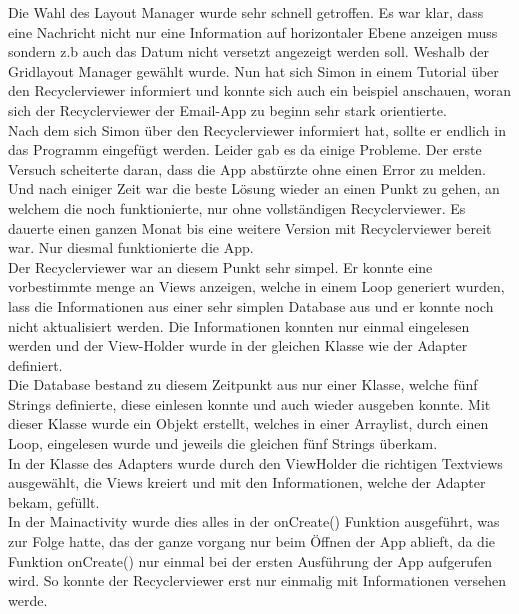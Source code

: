 \documentclass[a4paper,11pt]{article}
\begin{document}
Die Wahl des Layout Manager wurde sehr schnell getroffen. Es war klar, dass eine Nachricht nicht nur eine Information auf horizontaler Ebene anzeigen muss sondern
z.b auch das Datum nicht versetzt angezeigt werden soll. Weshalb der Gridlayout Manager gewählt wurde. Nun hat sich Simon in einem Tutorial über den Recyclerviewer informiert
und konnte sich auch ein beispiel anschauen, woran sich der Recyclerviewer der Email-App zu beginn sehr stark orientierte. \\


Nach dem sich Simon über den Recyclerviewer informiert hat, sollte er endlich in das Programm eingefügt werden. Leider gab es da einige Probleme. Der erste Versuch scheiterte daran,
dass die App abstürzte ohne einen Error zu melden. Und nach einiger Zeit war die beste Lösung wieder an einen Punkt zu gehen, an welchem die noch funktionierte, nur ohne vollständigen 
Recyclerviewer. Es dauerte einen ganzen Monat bis eine weitere Version mit Recyclerviewer bereit war. Nur diesmal funktionierte die App. \\

Der Recyclerviewer war an diesem Punkt sehr simpel. Er konnte eine vorbestimmte menge an Views anzeigen, welche in einem Loop generiert wurden, lass die Informationen aus
einer sehr simplen Database aus und er konnte noch nicht aktualisiert werden. Die Informationen konnten nur einmal eingelesen werden und der View-Holder wurde in der gleichen Klasse wie 
der Adapter definiert. \\

Die Database bestand zu diesem Zeitpunkt aus nur einer Klasse, welche fünf Strings definierte, diese einlesen konnte und auch wieder ausgeben konnte. Mit dieser Klasse wurde
ein Objekt erstellt, welches in einer Arraylist, durch einen Loop, eingelesen wurde und jeweils die gleichen fünf Strings überkam. \\

In der Klasse des Adapters wurde durch den ViewHolder die richtigen Textviews ausgewählt, die Views kreiert und mit den Informationen, welche der Adapter bekam, gefüllt. \\

In der Mainactivity wurde dies alles in der onCreate() Funktion ausgeführt, was zur Folge hatte, das der ganze vorgang nur beim Öffnen der App ablieft, da die Funktion onCreate()
nur einmal bei der ersten Ausführung der App aufgerufen wird. So konnte der Recyclerviewer erst nur einmalig mit Informationen versehen werde.
\end{document}
